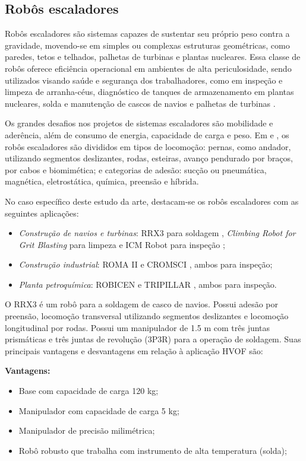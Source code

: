 \subsection{Robôs escaladores}
Robôs escaladores são sistemas capazes de sustentar seu próprio peso contra a
gravidade, movendo-se em simples ou complexas estruturas geométricas, como
paredes, tetos e telhados, palhetas de turbinas e plantas nucleares.
Essa classe de robôs oferece eficiência operacional em ambientes
de alta periculosidade, sendo utilizados visando saúde e segurança dos
trabalhadores, como em inspeção e limpeza de arranha-céus, diagnóstico de
tanques de armazenamento em plantas nucleares, solda e manutenção de cascos de
navios e palhetas de turbinas \cite{clawar}.

Os grandes desafios nos projetos de sistemas escaladores são mobilidade e
aderência, além de consumo de energia, capacidade de carga e peso. Em
\cite{modular}e \cite{climbsurv}, os robôs escaladores são divididos em tipos de locomoção:
pernas, como andador, utilizando segmentos deslizantes, rodas, esteiras, avanço
pendurado por braços, por cabos e biomimética; e categorias de adesão: sucção ou
pneumática, magnética, eletrostática, química, preensão e híbrida.

No caso específico deste estudo da arte, destacam-se os robôs escaladores com as
seguintes aplicações:

\begin{itemize}
  \item \emph{Construção de navios e turbinas}: RRX3 para soldagem
  \citep{rrx3}, \emph{Climbing Robot for Grit Blasting} para limpeza
  \citep{crgb} e ICM Robot para inspeção \citep{icm};
  \item \emph{Construção industrial}: ROMA II \citep{roma} e
  CROMSCI \citep{CROMSCI}, ambos para inspeção; 
 \item \emph{Planta petroquímica}: ROBICEN \citep{robicen} e
  TRIPILLAR \citep{tripillar}, ambos para inspeção.  
\end{itemize}

O RRX3 é um robô para a soldagem de casco de navios. Possui adesão por
preensão, locomoção transversal utilizando segmentos deslizantes e locomoção
longitudinal por rodas. Possui um manipulador de 1.5 m com três juntas
prismáticas e três juntas de revolução (3P3R) para a operação de soldagem. Suas
principais vantagens e desvantagens em relação à aplicação HVOF são:

\textbf{Vantagens:}
\begin{itemize}
  \item Base com capacidade de carga 120 kg;
  \item Manipulador com capacidade de carga 5 kg;
  \item Manipulador de precisão milimétrica;
  \item Robô robusto que trabalha com instrumento de alta temperatura (solda);
\end{itemize}

